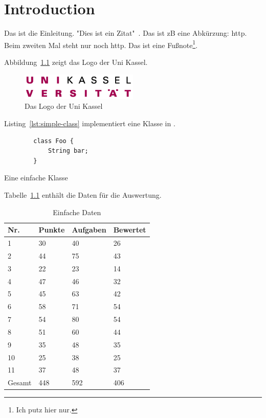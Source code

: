 \chapter{Introduction}\label{ch:introduction}

Das ist die Einleitung.
"Dies ist ein Zitat"~\cite{dragon-book}.
Das ist \ac{zB} eine Abkürzung: \ac{http}.
Beim zweiten Mal steht nur noch \ac{http}.
Das ist eine Fußnote\footnote{Ich putz hier nur.}.

Abbildung~\ref{fig:uni-kassel-logo} zeigt das Logo der Uni Kassel.

\begin{figure}[htp] %
    \centering
    \includegraphics[width=0.5\textwidth]{images/Logo_UniKassel.png} %
    \caption{Das Logo der Uni Kassel}
    \label{fig:uni-kassel-logo}
\end{figure}

Listing~\ref{lst:simple-class} implementiert eine Klasse in .

\begin{listing}[htp]
    \begin{verbatim}
        class Foo {
            String bar;
        }
    \end{verbatim}
    \caption{Eine einfache Klasse}
    \label{lst:simple-class}
\end{listing}

Tabelle~\ref{tbl:evaluation-data} enthält die Daten für die Auswertung.

\begin{table}[htp]
    \centering
    \caption{Einfache Daten}
    \begin{tabular}{|l|l|l|l|}
    \hline
        Nr. & Punkte & Aufgaben & Bewertet \\
        \hline
        1  & 30 & 40 & 26 \\
        2  & 44 & 75 & 43 \\
        3  & 22 & 23 & 14 \\
        4  & 47 & 46 & 32 \\
        5  & 45 & 63 & 42 \\
        6  & 58 & 71 & 54 \\
        7  & 54 & 80 & 54 \\
        8  & 51 & 60 & 44 \\
        9  & 35 & 48 & 35 \\
        10 & 25 & 38 & 25 \\
        11 & 37 & 48 & 37 \\
        \hline
        Gesamt & 448 & 592 & 406 \\
        \hline
    \end{tabular}
    \label{tbl:evaluation-data}
\end{table}